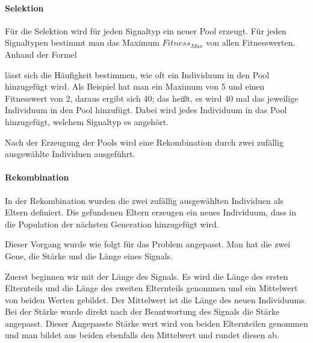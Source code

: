 \paragraph{Selektion}
F{\"u}r die Selektion wird f{\"u}r jeden Signaltyp ein neuer Pool erzeugt. 
F{\"u}r jeden Signaltypen bestimmt man das Maximum $Fitness_{Max}$ von allen Fitnesswerten.
Anhand der Formel 

l{\"a}sst sich die H{\"a}ufigkeit bestimmen, wie oft ein Individuum in den Pool hinzugef{\"u}gt wird. Als Beispiel hat man ein Maximum von 5 und einen Fitnesswert von 2, daraus ergibt sich 40; das hei{\ss}t, es wird 40 mal das jeweilige Individuum in den Pool hinzuf{\"u}gt. Dabei wird jedes Individuum in das Pool hinzugef{\"u}gt, welchem Signaltyp es angeh{\"o}rt. 

Nach der Erzeugung der Pools wird eine Rekombination durch zwei zuf{\"a}llig ausgew{\"a}hlte Individuen ausgef{\"u}hrt.


\paragraph{Rekombination}
In der Rekombination wurden die zwei zuf{\"a}llig ausgew{\"a}hlten Individuen als Eltern definiert. Die gefundenen Eltern erzeugen ein neues Individuum, dass in die Population der n{\"a}chsten Generation hinzugef{\"u}gt wird. 

Dieser Vorgang wurde wie folgt f{\"u}r das Problem angepasst. Man hat die zwei Gene, die St{\"a}rke und die L{\"a}nge eines Signals.

Zuerst beginnen wir mit der L{\"a}nge des Signals. Es wird die L{\"a}nge des ersten Elternteils und die L{\"a}nge des zweiten Elternteils genommen und ein Mittelwert von beiden Werten gebildet. Der Mittelwert ist die L{\"a}nge des neuen Individuums.
Bei der St{\"a}rke wurde direkt nach der Beantwortung des Signals die St{\"a}rke angepasst. Dieser Angepasste St{\"a}rke wert wird von beiden Elternteilen genommen und man bildet aus beiden ebenfalls den Mittelwert und rundet diesen ab.

